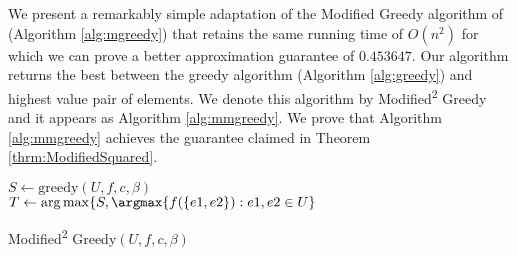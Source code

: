We present a remarkably simple adaptation of the Modified Greedy algorithm of \cite{khuller1999budgeted} (Algorithm \ref{alg:mgreedy}) that retains the same running time of $O(n^2)$ for which we can prove a better approximation guarantee of $0.453647$.
Our algorithm returns the best between the greedy algorithm (Algorithm \ref{alg:greedy}) and highest value pair of elements.
We denote this algorithm by Modified\textsuperscript{2} Greedy and it appears as Algorithm \ref{alg:mmgreedy}.
We prove that Algorithm \ref{alg:mmgreedy} achieves the guarantee claimed in Theorem \ref{thrm:ModifiedSquared}.




\begin{algorithm}
	$S \leftarrow \text{greedy}(U, f, c, \beta)$
	\\
	$T \leftarrow \arg\max\{S, \argmax \{ f(\{ e1,e2\}):e1,e2\in U\}$
	\\
	\caption{Modified\textsuperscript{2} Greedy$(U, f, c, \beta)$}
	\label{alg:mmgreedy}
\end{algorithm}

